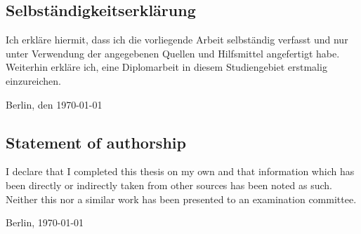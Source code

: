 \documentclass[a4paper,10pt]{article}
\begin{document}
\thispagestyle{empty}


{\parindent 0cm
  
  \subsection*{Selbst\"andigkeitserkl\"arung}
  Ich erkl\"are hiermit, dass ich die vorliegende Arbeit selbst\"andig verfasst 
  und nur unter Verwendung der angegebenen Quellen und Hilfsmittel angefertigt habe. 
  Weiterhin erkl\"are ich, eine Diplomarbeit in diesem Studiengebiet erstmalig einzureichen.\\
  \vspace{3\baselineskip}
  
  Berlin, den \today \hspace{0.25\linewidth}\parbox{0.3\linewidth}{\dotfill}

\subsection*{Statement of authorship}
I declare that I completed this thesis on my own and that information which has been 
directly or indirectly taken from other sources has been noted as such. Neither this 
nor a similar work has been presented to an examination committee.

  \vspace{3\baselineskip}
  
  Berlin, \today \hspace{0.25\linewidth}\parbox{0.3\linewidth}{\dotfill}
}
\end{document}
